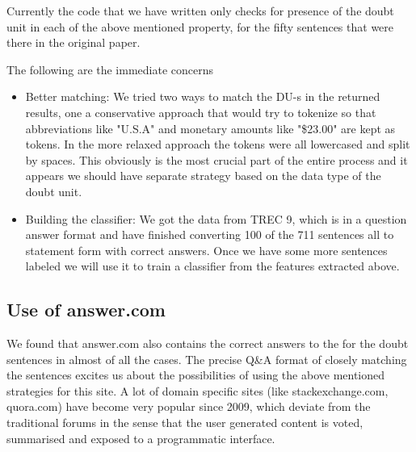 \documentclass[11pt]{article}
\begin{document}
Currently the code that we have written only checks for presence of the doubt unit in each of the above mentioned property, for the fifty sentences that were there in the original paper. 

The following are the immediate concerns 
\begin{itemize}
\item Better matching: We tried two ways to match the DU-s in the returned results, one a conservative approach that would try to tokenize so that abbreviations like "U.S.A" and monetary amounts like "\$23.00" are kept as tokens. In the more relaxed approach the tokens were all lowercased and split by spaces. This obviously is the most crucial part of the entire process and it appears we should have separate strategy based on the data type of the doubt unit.
\item Building the classifier: We got the data from TREC 9, which is in a question answer format and have finished converting 100 of the 711 sentences all to statement form with correct answers. Once we have some more sentences labeled we will use it to train a classifier from the features extracted above.
\end{itemize} 

% 
\subsection{Use of answer.com}
We found that answer.com also contains the correct answers to the for the doubt sentences in almost of all the cases. The precise Q\&A format of closely matching the sentences excites us about the possibilities of using the above mentioned strategies for this site. A lot of domain specific sites (like stackexchange.com, quora.com) have become very popular since 2009, which deviate from the traditional forums in the sense that the user generated content is voted, summarised and exposed to a programmatic interface. 
\end{document}
